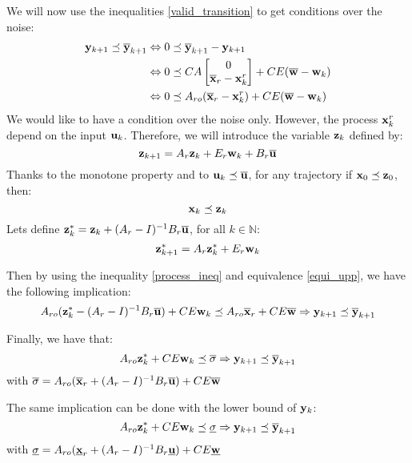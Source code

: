 We will now use the inequalities \ref{valid_transition} to get conditions over the noise:
\begin{align}
 \mathbf{y}_{k+1} \preceq \overline{ \mathbf{y}}_{k+1}
& \Leftrightarrow
0 \preceq \overline{ \mathbf{y}}_{k+1} -  \mathbf{y}_{k+1}
\nonumber \\
& \Leftrightarrow
0 \preceq
C A \begin{bmatrix} 0 \\ \overline{ \mathbf{x}}_r- \mathbf{x}^r_k \end{bmatrix}
+ C E (\overline{ \mathbf{w}} - \mathbf{w}_{k})
\nonumber \\
& \Leftrightarrow
0 \preceq
A_{ro} ( \overline{ \mathbf{x}}_r- \mathbf{x}^r_k ) + C E (\overline{ \mathbf{w}} - \mathbf{w}_{k})
\label{equi_upp}
\end{align}
We would like to have a condition over the noise only. However, the process $ \mathbf{x}^r_k$ depend on the input $ \mathbf{u}_{k}$. Therefore, we will introduce the variable $ \mathbf{z}_k$ defined by:
\begin{equation}
 \mathbf{z}_{k+1} = A_r  \mathbf{z}_k + E_r  \mathbf{w}_{k} + B_r \overline{ \mathbf{u}}
\end{equation}
Thanks to the monotone property and to $ \mathbf{u}_{k} \preceq \overline{ \mathbf{u}}$, for any trajectory if $ \mathbf{x}_0 \preceq  \mathbf{z}_0$, then:
\begin{equation}\label{process_ineq}
 \mathbf{x}_{k} \preceq  \mathbf{z}_k
\end{equation}
Lets define $ \mathbf{z}_k^* =  \mathbf{z}_k + (A_r-I)^{-1} B_r \overline{ \mathbf{u}}$, for all $k\in \mathbb{N}$:
\begin{equation}
 \mathbf{z}_{k+1}^* = A_r  \mathbf{z}_k^* + E_r  \mathbf{w}_{k}
\end{equation}

Then by using the inequality \ref{process_ineq} and equivalence \ref{equi_upp}, we have the following implication:
\begin{equation}
A_{ro} ( \mathbf{z}_k^* - (A_r-I)^{-1} B_r \overline{ \mathbf{u}} ) + CE  \mathbf{w}_{k} 
\preceq A_{ro} \overline{ \mathbf{x}}_r + CE \overline{ \mathbf{w}}
\Rightarrow 
 \mathbf{y}_{k+1} \preceq \overline{ \mathbf{y}}_{k+1}
\end{equation}

\newcommand{\sig}{\sigma}
\newcommand{\ssup}{\msup{\sig}}
\newcommand{\sinf}{\minf{\sig}}
Finally, we have that:
\begin{equation}
\Aro \zk^* + CE \wk 
\mleq 
\ssup
\Rightarrow 
\ykn \mleq \sykn
\label{impl_upp}
\end{equation}
with $\ssup = \Aro ( \xrsup + (\Ar-I)^{-1} \Br \msup{\u} ) + CE \msup{\w}$

The same implication can be done with the lower bound of $ \mathbf{y}_{k}$:
\begin{equation}
\Aro \zk^* + CE \wk 
\mleq 
\sinf
\Rightarrow 
\ykn \mleq \sykn
\label{impl_low}
\end{equation}
with $\sinf = \Aro ( \xrinf + (\Ar-I)^{-1} \Br \minf{\u} ) + CE \minf{\w}$

